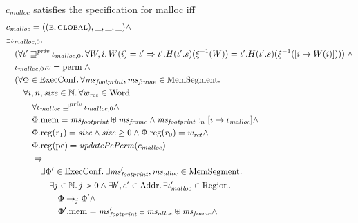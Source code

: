 \documentclass[a4paper]{article}
\newcommand{\var}[1]{\mathit{#1}}
\newcommand{\hs}{\var{ms}}
\newcommand{\ms}{\hs}
\newcommand{\pcreg}{\mathrm{pc}}
\newcommand{\heap}{\var{mem}}
\newcommand{\plainproj}[1]{\mathrm{#1}}
\newcommand{\memheap}[1][\Phi]{#1.\plainproj{mem}}
\newcommand{\memreg}[1][\Phi]{#1.\plainproj{reg}}
\newcommand{\plainfun}[2]{
  \ifthenelse{\equal{#2}{}}
  {\mathit{#1}}
  {\mathit{#1}(#2)}
}
\newcommand{\updatePcPerm}[1]{\plainfun{updatePcPerm}{#1}}
\newcommand{\futurestr}{\mathbin{\sqsupseteq}^{\var{priv}}}
\newcommand{\heapSat}[3][\heap]{#1 :_{#2} #3}
\newcommand{\codelabel}[1]{\mathit{#1}}
\newcommand{\malloc}{\codelabel{malloc}}
\newcommand{\plaindom}[1]{\mathrm{#1}}
\newcommand{\Words}{\plaindom{Word}}
\newcommand{\Addrs}{\plaindom{Addr}}
\newcommand{\ExecConfs}{\plaindom{ExecConf}}
\newcommand{\HeapSegments}{\plaindom{MemSegment}}
\newcommand{\nats}{\mathbb{N}}
\newcommand{\Regions}{\plaindom{Region}}
\newcommand{\plainperm}[1]{\textsc{#1}}
\newcommand{\entry}{\plainperm{e}}
\newcommand{\glob}{\plainperm{global}}
\newcommand{\plainview}[1]{\mathrm{#1}}
\newcommand{\perma}{\plainview{perm}}
\newcommand{\step}[1][]{\rightarrow_{#1}}
\begin{document}
              \begin{specification}
                \label{spec:malloc}
                $c_\malloc$ satisfies the specification for malloc iff
                \[  
                  \begin{aligned}
                    &c_\malloc = ((\entry,\glob),\_,\_,\_) \land\\
                    &\exists \iota_{\malloc,0} \ldotp \\
                    &\quad (\forall \iota' \futurestr \iota_{\malloc,0} \ldotp \forall W,i \ldotp W(i)=\iota' \Rightarrow \iota'.H (\iota'.s) (\xi^{-1}(W)) = \iota'.H (\iota'.s) (\xi^{-1}([i \mapsto W(i)])) ) \; \land \\
                    &\quad \iota_{\malloc,0}.v = \perma \; \land \\
                    &\quad (\forall \Phi \in \ExecConfs \ldotp \forall \ms_{\var{footprint}}, \hsframe \in \HeapSegments \ldotp \\
                    &\qquad \forall i, n, \size \in \nats \ldotp \forall
                    w_{\var{ret}} \in \Words \ldotp \\
                    &\qquad \quad \forall \iota_\malloc \futurestr \iota_{\malloc,0} \land \\
                    &\qquad \quad \memheap = \ms_{\var{footprint}} \uplus \hsframe \land \heapSat[\ms_{\var{footprint}}]{n}{[i \mapsto \iota_\malloc]} \land \\
                    &\qquad \quad \memreg(r_1) = \size \land \size \geq 0 \land  \memreg(r_0) = w_{\var{ret}} \land \\
                    &\qquad \quad \memreg(\pcreg) = \updatePcPerm{c_\malloc} \\ %
                    &\qquad \quad \Rightarrow \\
                    &\qquad \qquad\exists \Phi' \in \ExecConfs \ldotp \exists \ms_{\var{footprint}}', \ms_{\var{alloc}} \in \HeapSegments\ldotp\\
                    &\qquad \qquad \quad \exists j \in \nats \ldotp j > 0 \land \exists b',e'\in \Addrs \ldotp \exists \iota_\malloc' \in \Regions \ldotp \\
                    &\qquad \qquad \qquad \Phi \step[j] \Phi' \land \\
                    &\qquad \qquad \qquad \memheap[\Phi']=\ms_{\var{footprint}}' \uplus \hs_{\var{alloc}} \uplus \hsframe \land\\

\end{aligned}\]
\end{specification}
\end{document}
